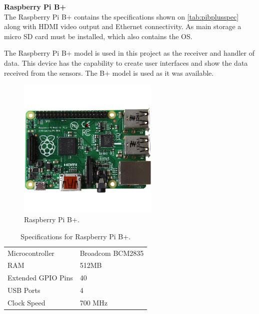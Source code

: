 \textbf{Raspberry Pi B+}\\
The Raspberry Pi B+ contains the specifications shown on \ref{tab:pibplusspec} along with HDMI video output and Ethernet connectivity. As main storage a micro SD card must be installed, which also contains the OS.

The Raspberry Pi B+ model is used in this project as the receiver and handler of data. This device has the capability to create user interfaces and show the data received from the sensors. The B+ model is used as it was available.

\begin{figure}[h!]
\centering
\includegraphics[width=0.6\textwidth]{chapters/analysis/figs/raspberry-pi-model-b-plus.png}
\caption{Raspberry Pi B+\cite{pibplus}.}
\label{fig:pibplus}
\end{figure}

\begin{table}[h!]
\centering
\begin{tabular}{| l | l |}
\hline
Microcontroller & Broadcom BCM2835\\
RAM & 512MB\\
Extended GPIO Pins & 40\\
USB Ports & 4\\
Clock Speed & 700 MHz\\
\hline
\end{tabular}
\caption{Specifications for Raspberry Pi B+\cite{pispecs}.}
\end{table}
\label{tab:pibplusspec}